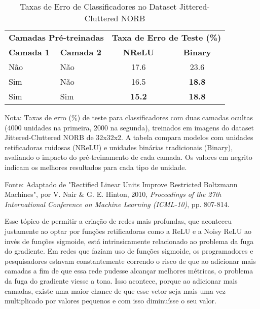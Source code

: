 \begin{table}[ht]
    \centering
    \begin{threeparttable}
        \caption{Taxas de Erro de Classificadores no Dataset Jittered-Cluttered NORB}
        \label{tab:nrelu_norb_comparativo}
        \begin{tabular}{llcc}
            \toprule
            \multicolumn{2}{c}{\textbf{Camadas Pré-treinadas}} & \multicolumn{2}{c}{\textbf{Taxa de Erro de Teste (\%)}} \\
            \cmidrule(r){1-2} \cmidrule(r){3-4} %
            \textbf{Camada 1} & \textbf{Camada 2} & \textbf{NReLU} & \textbf{Binary} \\
            \midrule
            
            Não & Não & 17.6 & 23.6 \\
            Sim & Não & 16.5 & \textbf{18.8} \\
            Sim & Sim & \textbf{15.2} & \textbf{18.8} \\
            
            \bottomrule
        \end{tabular}
        
        \begin{tablenotes}[para]
            \small
            \item[] Nota: Taxas de erro (\%) de teste para classificadores com duas camadas ocultas (4000 unidades na primeira, 2000 na segunda), treinados em imagens do dataset Jittered-Cluttered NORB de 32x32x2. A tabela compara modelos com unidades retificadoras ruidosas (NReLU) e unidades binárias tradicionais (Binary), avaliando o impacto do pré-treinamento de cada camada. Os valores em negrito indicam os melhores resultados para cada tipo de unidade.
            \item[] Fonte: Adaptado de "Rectified Linear Units Improve Restricted Boltzmann Machines", por V. Nair \& G. E. Hinton, 2010, \textit{Proceedings of the 27th International Conference on Machine Learning (ICML-10)}, pp. 807-814.
        \end{tablenotes}
        
    \end{threeparttable}
\end{table}

Esse tópico de permitir a criação de redes mais profundas, que aconteceu justamente ao optar por funções retificadoras como a ReLU e a Noisy ReLU ao invés de funções sigmoide, está intrinsicamente relacionado ao problema da fuga do gradiente. Em redes que faziam uso de funções sigmoide, os programadores e pesquisadores estavam constantemente correndo o risco de que ao adicionar mais camadas a fim de que essa rede pudesse alcançar melhores métricas, o problema da fuga do gradiente viesse a tona. Isso acontece, porque ao adicionar mais camadas, existe uma maior chance de que esse vetor seja mais uma vez multiplicado por valores pequenos e com isso diminuísse o seu valor.

